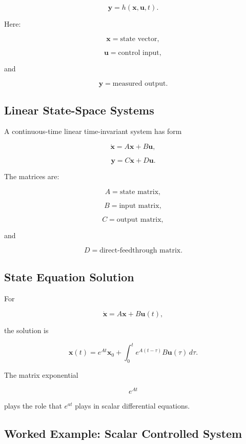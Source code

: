 \[
\boxed{
\mathbf{y}
=
h(\mathbf{x},\mathbf{u},t).
}
\]

Here:

\[
\mathbf{x}
=
\text{state vector},
\]

\[
\mathbf{u}
=
\text{control input},
\]

and

\[
\mathbf{y}
=
\text{measured output}.
\]

\subsection{Linear State-Space Systems}
\label{subsec:linear-state-space-control}

A continuous-time linear time-invariant system has form

\[
\boxed{
\dot{\mathbf{x}}
=
A\mathbf{x}
+
B\mathbf{u},
}
\]

\[
\boxed{
\mathbf{y}
=
C\mathbf{x}
+
D\mathbf{u}.
}
\]

The matrices are:

\[
A
=
\text{state matrix},
\]

\[
B
=
\text{input matrix},
\]

\[
C
=
\text{output matrix},
\]

and

\[
D
=
\text{direct-feedthrough matrix}.
\]

\subsection{State Equation Solution}
\label{subsec:state-equation-solution}

For

\[
\dot{\mathbf{x}}
=
A\mathbf{x}
+
B\mathbf{u}(t),
\]

the solution is

\[
\boxed{
\mathbf{x}(t)
=
e^{At}\mathbf{x}_0
+
\int_0^t
e^{A(t-\tau)}
B\mathbf{u}(\tau)
\,d\tau.
}
\]

The matrix exponential

\[
e^{At}
\]

plays the role that \(e^{at}\) plays in scalar differential equations.

\subsection{Worked Example: Scalar Controlled System}
\label{subsec:worked-scalar-control}

